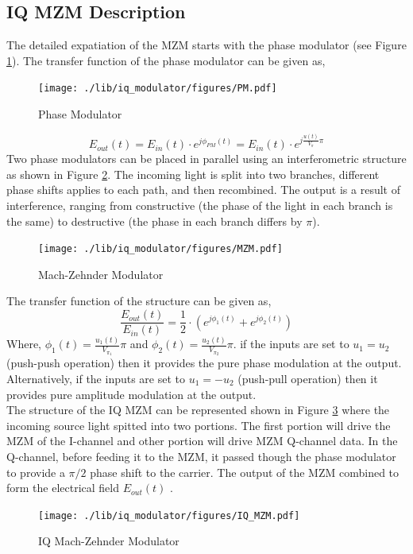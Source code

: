 \subsection*{IQ MZM Description}
The detailed expatiation of the MZM starts with the phase modulator (see Figure \ref{Phase_Modulator}). The transfer function of the phase modulator can be given as,
\begin{figure}[h]
	\centering
	\texttt{[image: ./lib/iq\_modulator/figures/PM.pdf]}
	\label{Phase_Modulator}\caption{Phase Modulator}
\end{figure}
\begin{equation*}
E_{out}(t)=E_{in}(t)\cdot e^{j\phi_{PM}(t)} = E_{in}(t)\cdot e^{j\frac{u(t)}{V_{\pi}}\pi}
\label{PM_TF}
\end{equation*}
Two phase modulators can be placed in parallel using an interferometric structure as shown in Figure \ref{MZM}. The incoming light is split into two branches, different phase shifts applies to each path, and then recombined.
The output is a result of interference, ranging from constructive (the phase of the light in each branch is the same) to destructive (the phase in each branch differs by $\pi$).
\begin{figure}[h]
	\centering
	\texttt{[image: ./lib/iq\_modulator/figures/MZM.pdf]}
	\label{MZM}\caption{Mach-Zehnder Modulator}
\end{figure}
The transfer function of the structure can be given as,
\begin{equation}
\dfrac{E_{out}(t)}{E_{in}(t)} = \frac{1}{2}\cdot(e^{j\phi_{1}(t)}+e^{j\phi_{2}(t)})
\label{MZM_TF}
\end{equation}
Where, $\phi_{1}(t)=\frac{u_{1}(t)}{V_{\pi_{1}}} \pi$ and  $\phi_{2}(t)=\frac{u_{2}(t)}{V_{\pi_{2}}} \pi$. if the inputs are set to $u_{1}=u_{2}$ (push-push operation) then it provides the pure phase modulation at the output. Alternatively, if the inputs are set to $u_{1}=-u_{2}$ (push-pull operation) then it provides pure amplitude modulation at the output.\\
The structure of the IQ MZM can be represented  shown in Figure \ref{IQ_Mach-Zehnder_Modulator} where the incoming source light spitted into two portions. The first portion will drive the MZM of the I-channel and other portion will drive MZM Q-channel data. In the Q-channel, before feeding it to the MZM, it passed though the phase modulator to provide a $\pi /2$ phase shift to the carrier. The output of the MZM combined to form the electrical field $E_{out}(t)$ \cite{NPTEL}.
\begin{figure}[h]
	\centering
	\texttt{[image: ./lib/iq\_modulator/figures/IQ\_MZM.pdf]}
	\label{IQ_Mach-Zehnder_Modulator}\caption{IQ Mach-Zehnder Modulator}
\end{figure}
